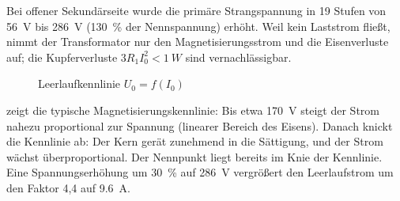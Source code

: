 \documentclass[a4paper,11pt]{scrreprt}
\begin{document}
Bei offener Sekundärseite wurde die primäre Strangspannung in 19 Stufen von \SI{56}{V} bis \SI{286}{V} (\SI{130}{\percent} der Nennspannung) erhöht. Weil kein Laststrom fließt, nimmt der Transformator nur den Magnetisierungsstrom und die Eisenverluste auf; die Kupferverluste $3R_1I_0^2 < \SI{1}{W}$ sind vernachlässigbar.

\begin{figure}[H]
\centering
{}
\caption{Leerlaufkennlinie $U_0 = f(I_0)$}
\label{fig:ll}
\end{figure}

 zeigt die typische Magnetisierungskennlinie: Bis etwa \SI{170}{V} steigt der Strom nahezu proportional zur Spannung (linearer Bereich des Eisens). Danach knickt die Kennlinie ab: Der Kern gerät zunehmend in die Sättigung, und der Strom wächst überproportional. Der Nennpunkt liegt bereits im Knie der Kennlinie. Eine Spannungserhöhung um \SI{30}{\percent} auf \SI{286}{V} vergrößert den Leerlaufstrom um den Faktor 4,4 auf \SI{9.6}{A}.
\end{document}
